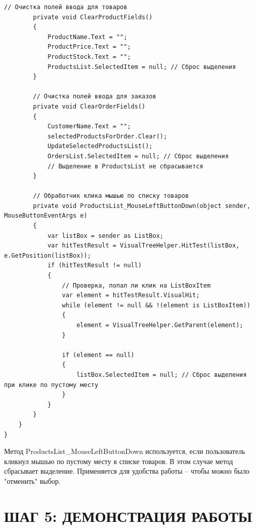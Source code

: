 \documentclass[12pt]{article}
\newcommand{\colorGIT}[1]{\textcolor{CtpGreen}{#1}}
\begin{document}
\begin{lstlisting}[style=csharp_catppuccin, caption=\colorGIT{\href{https://github.com/WebMasterIT/Csharp_Labs/blob/ec375afd16c0647b337cf3d8a79c8bef904fc1be/3lab/StoreManager/MainWindow.xaml.cs\#L379-L432}{Методы}} очистки полей и сброса выделения товара, label=lst:MethodClear]
        // Очистка полей ввода для товаров
        private void ClearProductFields()
        {
            ProductName.Text = "";
            ProductPrice.Text = "";
            ProductStock.Text = "";
            ProductsList.SelectedItem = null; // Сброс выделения
        }

        // Очистка полей ввода для заказов
        private void ClearOrderFields()
        {
            CustomerName.Text = "";
            selectedProductsForOrder.Clear();
            UpdateSelectedProductsList();
            OrdersList.SelectedItem = null; // Сброс выделения
            // Выделение в ProductsList не сбрасывается
        }

        // Обработчик клика мышью по списку товаров
        private void ProductsList_MouseLeftButtonDown(object sender, MouseButtonEventArgs e)
        {
            var listBox = sender as ListBox;
            var hitTestResult = VisualTreeHelper.HitTest(listBox, e.GetPosition(listBox));
            if (hitTestResult != null)
            {
                // Проверка, попал ли клик на ListBoxItem
                var element = hitTestResult.VisualHit;
                while (element != null && !(element is ListBoxItem))
                {
                    element = VisualTreeHelper.GetParent(element);
                }

                if (element == null)
                {
                    listBox.SelectedItem = null; // Сброс выделения при клике по пустому месту
                }
            }
        }
    }
}
\end{lstlisting}

Метод ProductsList\_MouseLeftButtonDown используется, если пользователь кликнул мышью по пустому месту в списке товаров. В этом случае метод сбрасывает выделение. Применяется для удобства работы -- чтобы можно было "отменить" выбор.

\pagebreak


\section{ШАГ 5: ДЕМОНСТРАЦИЯ РАБОТЫ \ \texorpdfstring{\faGlasses}{}}
\end{document}
